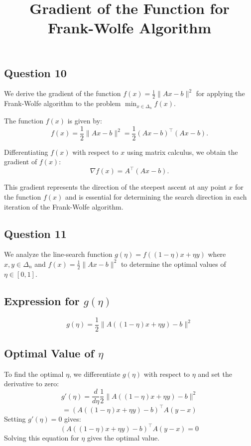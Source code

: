 \documentclass[12p]{article}
\begin{document}
\subsection*{Question 10} 


\title{Gradient of the Function for Frank-Wolfe Algorithm}
\maketitle

We derive the gradient of the function \( f(x) = \frac{1}{2} \|Ax - b\|^2 \) for applying the Frank-Wolfe algorithm to the problem \( \min_{x \in \Delta_n} f(x) \).

The function \( f(x) \) is given by:
\[ f(x) = \frac{1}{2} \|Ax - b\|^2 = \frac{1}{2} (Ax - b)^\top (Ax - b). \]

Differentiating \( f(x) \) with respect to \( x \) using matrix calculus, we obtain the gradient of \( f(x) \):
\[ \nabla f(x) = A^\top (Ax - b). \]

This gradient represents the direction of the steepest ascent at any point \( x \) for the function \( f(x) \) and is essential for determining the search direction in each iteration of the Frank-Wolfe algorithm.


\subsection*{Question 11} 

We analyze the line-search function \( g(\eta) = f((1 - \eta)x + \eta y) \) where \( x, y \in \Delta_n \) and \( f(x) = \frac{1}{2}\|Ax - b\|^2 \) to determine the optimal values of \( \eta \in [0, 1] \).

\subsection*{Expression for \( g(\eta) \)}
\[ g(\eta) = \frac{1}{2} \|A((1 - \eta)x + \eta y) - b\|^2 \]

\subsection*{Optimal Value of \( \eta \)}
To find the optimal \(\eta\), we differentiate \(g(\eta)\) with respect to \(\eta\) and set the derivative to zero:
\[ g'(\eta) = \frac{d}{d\eta} \frac{1}{2} \|A((1 - \eta)x + \eta y) - b\|^2 \]
\[ = (A((1 - \eta)x + \eta y) - b)^\top A(y - x) \]
Setting \( g'(\eta) = 0 \) gives:
\[ (A((1 - \eta)x + \eta y) - b)^\top A(y - x) = 0 \]
Solving this equation for \(\eta\) gives the optimal value.
\end{document}
